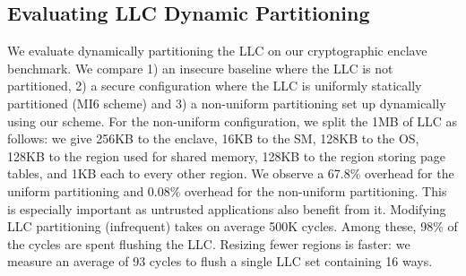 \subsection{Evaluating LLC Dynamic Partitioning}
\label{sec:evalllcpartitioning}

We evaluate dynamically partitioning the LLC on our cryptographic enclave benchmark.
We compare 1)
an insecure baseline where the LLC is not partitioned, 2) a secure configuration where the LLC is uniformly statically partitioned (MI6 scheme) and 3) a non-uniform partitioning set up dynamically using our scheme.
For the non-uniform configuration, we split the 1MB of LLC as follows: we give 256KB to the enclave, 16KB to the SM, 128KB to the OS, 128KB to the region used for shared memory, 128KB to the region storing page tables, and 1KB each to every other region.
We observe a 67.8\% overhead for the uniform partitioning and 0.08\% overhead for the non-uniform partitioning.
This is especially important as untrusted applications also benefit from it.
Modifying LLC partitioning (infrequent) takes on average 500K cycles.
Among these, 98\% of the cycles are spent flushing the LLC.
Resizing fewer regions is faster: we measure an average of 93 cycles to flush a single LLC set containing 16 ways.
